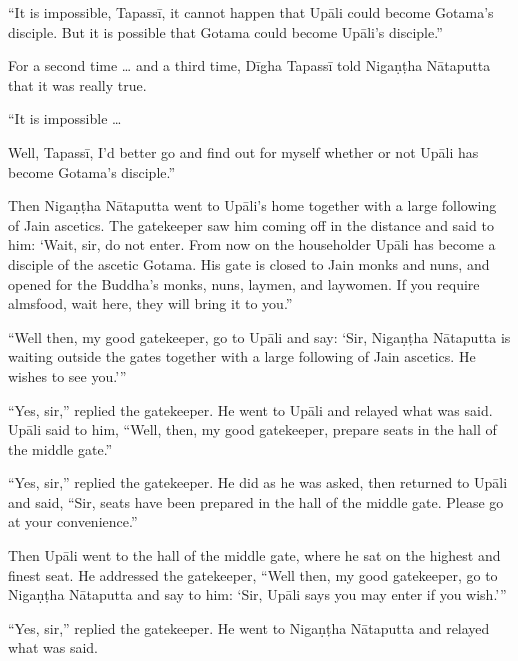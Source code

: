 \documentclass[12pt,openany]{book}%
\begin{document}
“It is impossible, \textsanskrit{Tapassī}, it cannot happen that \textsanskrit{Upāli} could become Gotama’s disciple. But it is possible that Gotama could become \textsanskrit{Upāli}’s disciple.” 

For a second time … and a third time, \textsanskrit{Dīgha} \textsanskrit{Tapassī} told \textsanskrit{Nigaṇṭha} \textsanskrit{Nātaputta} that it was really true. 

“It is impossible … 

Well, \textsanskrit{Tapassī}, I’d better go and find out for myself whether or not \textsanskrit{Upāli} has become Gotama’s disciple.” 

Then \textsanskrit{Nigaṇṭha} \textsanskrit{Nātaputta} went to \textsanskrit{Upāli}’s home together with a large following of Jain ascetics. The gatekeeper saw him coming off in the distance and said to him: ‘Wait, sir, do not enter. From now on the householder \textsanskrit{Upāli} has become a disciple of the ascetic Gotama. His gate is closed to Jain monks and nuns, and opened for the Buddha’s monks, nuns, laymen, and laywomen. If you require almsfood, wait here, they will bring it to you.” 

“Well then, my good gatekeeper, go to \textsanskrit{Upāli} and say: ‘Sir, \textsanskrit{Nigaṇṭha} \textsanskrit{Nātaputta} is waiting outside the gates together with a large following of Jain ascetics. He wishes to see you.’” 

“Yes, sir,” replied the gatekeeper. He went to \textsanskrit{Upāli} and relayed what was said. \textsanskrit{Upāli} said to him, “Well, then, my good gatekeeper, prepare seats in the hall of the middle gate.” 

“Yes, sir,” replied the gatekeeper. He did as he was asked, then returned to \textsanskrit{Upāli} and said, “Sir, seats have been prepared in the hall of the middle gate. Please go at your convenience.” 

Then \textsanskrit{Upāli} went to the hall of the middle gate, where he sat on the highest and finest seat. He addressed the gatekeeper, “Well then, my good gatekeeper, go to \textsanskrit{Nigaṇṭha} \textsanskrit{Nātaputta} and say to him: ‘Sir, \textsanskrit{Upāli} says you may enter if you wish.’” 

“Yes, sir,” replied the gatekeeper. He went to \textsanskrit{Nigaṇṭha} \textsanskrit{Nātaputta} and relayed what was said. 
\end{document}
